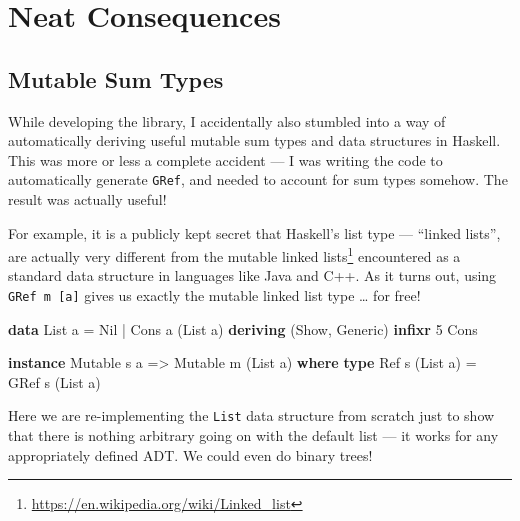\documentclass[]{article}
\newenvironment{Shaded}{}{}
\newcommand{\DataTypeTok}[1]{\textcolor[rgb]{0.56,0.13,0.00}{#1}}
\newcommand{\DecValTok}[1]{\textcolor[rgb]{0.25,0.63,0.44}{#1}}
\newcommand{\KeywordTok}[1]{\textcolor[rgb]{0.00,0.44,0.13}{\textbf{#1}}}
\newcommand{\NormalTok}[1]{#1}
\newcommand{\OperatorTok}[1]{\textcolor[rgb]{0.40,0.40,0.40}{#1}}
\newcommand{\OtherTok}[1]{\textcolor[rgb]{0.00,0.44,0.13}{#1}}
\renewcommand{\href}[2]{#2\footnote{\url{#1}}}
\begin{document}
\section{Neat Consequences}\label{neat-consequences}

\subsection{Mutable Sum Types}\label{mutable-sum-types}

While developing the library, I accidentally also stumbled into a way of
automatically deriving useful mutable sum types and data structures in Haskell.
This was more or less a complete accident --- I was writing the code to
automatically generate \texttt{GRef}, and needed to account for sum types
somehow. The result was actually useful!

For example, it is a publicly kept secret that Haskell's list type --- ``linked
lists'', are actually very different from the
\href{https://en.wikipedia.org/wiki/Linked_list}{mutable linked lists}
encountered as a standard data structure in languages like Java and C++. As it
turns out, using \texttt{GRef\ m\ {[}a{]}} gives us exactly the mutable linked
list type \ldots{} for free!

\begin{Shaded}
\begin{Highlighting}[]
\KeywordTok{data} \DataTypeTok{List}\NormalTok{ a }\OtherTok{=} \DataTypeTok{Nil} \OperatorTok{|} \DataTypeTok{Cons}\NormalTok{ a (}\DataTypeTok{List}\NormalTok{ a)}
  \KeywordTok{deriving}\NormalTok{ (}\DataTypeTok{Show}\NormalTok{, }\DataTypeTok{Generic}\NormalTok{)}
\KeywordTok{infixr} \DecValTok{5} \OtherTok{\textasciigrave{}Cons\textasciigrave{}}

\KeywordTok{instance} \DataTypeTok{Mutable}\NormalTok{ s a }\OtherTok{=\textgreater{}} \DataTypeTok{Mutable}\NormalTok{ m (}\DataTypeTok{List}\NormalTok{ a) }\KeywordTok{where}
    \KeywordTok{type} \DataTypeTok{Ref}\NormalTok{ s (}\DataTypeTok{List}\NormalTok{ a) }\OtherTok{=} \DataTypeTok{GRef}\NormalTok{ s (}\DataTypeTok{List}\NormalTok{ a)}
\end{Highlighting}
\end{Shaded}

Here we are re-implementing the \texttt{List} data structure from scratch just
to show that there is nothing arbitrary going on with the default list --- it
works for any appropriately defined ADT. We could even do binary trees!
\end{document}
